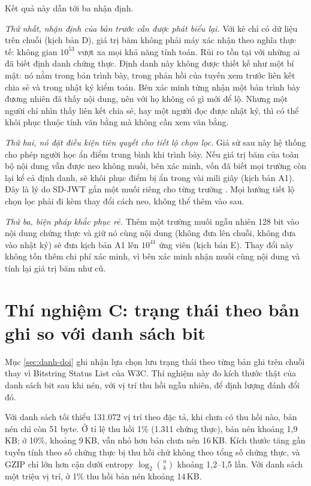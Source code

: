 Kết quả này dẫn tới ba nhận định.

\emph{Thứ nhất, nhận định của bản trước cần được phát biểu lại.} Với kẻ chỉ có dữ liệu trên chuỗi (kịch bản D), giá trị băm không phải máy xác nhận theo nghĩa thực tế: không gian $10^{53}$ vượt xa mọi khả năng tính toán. Rủi ro tồn tại với những ai đã biết định danh chứng thực. Định danh này không được thiết kế như một bí mật: nó nằm trong bản trình bày, trong phản hồi của tuyến xem trước liên kết chia sẻ và trong nhật ký kiểm toán. Bên xác minh từng nhận một bản trình bày đương nhiên đã thấy nội dung, nên với họ không có gì mới để lộ. Nhưng một người chỉ nhìn thấy liên kết chia sẻ, hay một người đọc được nhật ký, thì có thể khôi phục thuộc tính văn bằng mà không cần xem văn bằng.

\emph{Thứ hai, nó đặt điều kiện tiên quyết cho tiết lộ chọn lọc.} Giả sử sau này hệ thống cho phép người học ẩn điểm trung bình khi trình bày. Nếu giá trị băm của toàn bộ nội dung vẫn được neo không muối, bên xác minh, vốn đã biết mọi trường còn lại kể cả định danh, sẽ khôi phục điểm bị ẩn trong vài mili giây (kịch bản A1). Đây là lý do SD-JWT gắn một muối riêng cho từng trường \cite{RFC9901}. Mọi hướng tiết lộ chọn lọc phải đi kèm thay đổi cách neo, không thể thêm vào sau.

\emph{Thứ ba, biện pháp khắc phục rẻ.} Thêm một trường muối ngẫu nhiên 128 bit vào nội dung chứng thực và giữ nó cùng nội dung (không đưa lên chuỗi, không đưa vào nhật ký) sẽ đưa kịch bản A1 lên $10^{41}$ ứng viên (kịch bản E). Thay đổi này không tốn thêm chi phí xác minh, vì bên xác minh nhận muối cùng nội dung và tính lại giá trị băm như cũ.

\section{Thí nghiệm C: trạng thái theo bản ghi so với danh sách bit}
\label{sec:tn-statuslist}

Mục \ref{sec:danh-doi} ghi nhận lựa chọn lưu trạng thái theo từng bản ghi trên chuỗi thay vì Bitstring Status List của W3C. Thí nghiệm này đo kích thước thật của danh sách bit sau khi nén, với vị trí thu hồi ngẫu nhiên, để định lượng đánh đổi đó.



Với danh sách tối thiểu 131.072 vị trí theo đặc tả, khi chưa có thu hồi nào, bản nén chỉ còn 51 byte. Ở tỉ lệ thu hồi 1\% (1.311 chứng thực), bản nén khoảng 1,9\,KB; ở 10\%, khoảng 9\,KB, vẫn nhỏ hơn bản chưa nén 16\,KB. Kích thước tăng gần tuyến tính theo số chứng thực bị thu hồi chứ không theo tổng số chứng thực, và GZIP chỉ lớn hơn cận dưới entropy $\log_2\binom{n}{k}$ khoảng 1,2--1,5 lần. Với danh sách một triệu vị trí, ở 1\% thu hồi bản nén khoảng 14\,KB.

